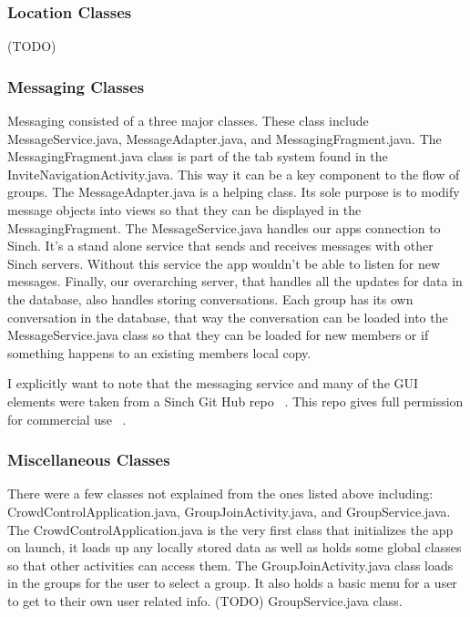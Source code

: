  	\subsubsection{Location Classes}
 	(TODO)
 	\subsubsection{Messaging Classes}
 Messaging consisted of a three major classes. These class include MessageService.java, MessageAdapter.java, and MessagingFragment.java. The MessagingFragment.java class is part of the tab system found in the InviteNavigationActivity.java. This way it can be a key component to the flow of groups. The MessageAdapter.java is a helping class. Its sole purpose is to modify message objects into views so that they can be displayed in the MessagingFragment. The MessageService.java handles our apps connection to Sinch. It's a stand alone service that sends and receives messages with other Sinch servers. Without this service the app wouldn't be able to listen for new messages. Finally, our overarching server, that handles all the updates for data in the database, also handles storing conversations. Each group has its own conversation in the database, that way the conversation can be loaded into the MessageService.java class so that they can be loaded for new members or if something happens to an existing members local copy.

I explicitly want to note that the messaging service and many of the GUI elements were taken from a Sinch Git Hub repo ~\cite{Choset: sinch/android-messaging-tutorial, https://github.com/sinch/android-messaging-tutorial}. This repo gives full permission for commercial use ~\cite{Choset: License, https://github.com/sinch/android-messaging-tutorial/blob/master/LICENSE}.

	\subsubsection{Miscellaneous Classes}
	There were a few classes not explained from the ones listed above including: CrowdControlApplication.java, GroupJoinActivity.java, and GroupService.java.
	The CrowdControlApplication.java is the very first class that initializes the app on launch, it loads up any locally stored data as well as holds some global classes so that other activities can access them.
	The GroupJoinActivity.java class loads in the groups for the user to select a group. It also holds a basic menu for a user to get to their own user related info.
	(TODO) GroupService.java class.

